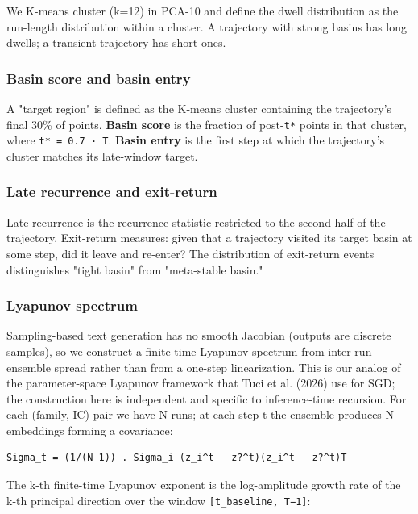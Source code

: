 \documentclass{article}
\theoremstyle{plain}
\theoremstyle{definition}
\begin{document}
We K-means cluster (k=12) in PCA-10 and define the dwell distribution
as the run-length distribution within a cluster. A trajectory with
strong basins has long dwells; a transient trajectory has short ones.

\subsubsection{Basin score and basin entry}

A "target region" is defined as the K-means cluster containing the
trajectory's final 30\% of points. \textbf{Basin score} is the fraction of
post-\texttt{t*} points in that cluster, where \texttt{t* = 0.7 · T}. \textbf{Basin entry}
is the first step at which the trajectory's cluster matches its
late-window target.

\subsubsection{Late recurrence and exit-return}

Late recurrence is the recurrence statistic restricted to the second
half of the trajectory. Exit-return measures: given that a trajectory
visited its target basin at some step, did it leave and re-enter? The
distribution of exit-return events distinguishes "tight basin" from
"meta-stable basin."

\subsubsection{Lyapunov spectrum}

Sampling-based text generation has no smooth Jacobian (outputs are
discrete samples), so we construct a finite-time Lyapunov spectrum
from inter-run ensemble spread rather than from a one-step linearization.
This is our analog of the parameter-space Lyapunov framework that Tuci
et al. (2026) use for SGD; the construction here is independent and
specific to inference-time recursion. For each (family, IC) pair we
have N runs; at each step t the ensemble produces N embeddings forming
a covariance:

\begin{verbatim}
Sigma_t = (1/(N-1)) . Sigma_i (z_i^t - z?^t)(z_i^t - z?^t)T
\end{verbatim}

The k-th finite-time Lyapunov exponent is the log-amplitude growth
rate of the k-th principal direction over the window
\texttt{[t\_baseline, T−1]}:
\end{document}
